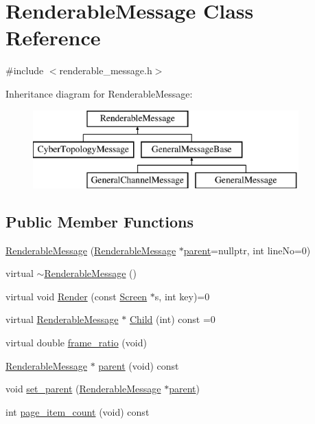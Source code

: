 \hypertarget{classRenderableMessage}{\section{Renderable\-Message Class Reference}
\label{classRenderableMessage}
}


{\ttfamily \#include $<$renderable\-\_\-message.\-h$>$}

Inheritance diagram for Renderable\-Message\-:\begin{figure}[H]
\begin{center}
\leavevmode
\includegraphics[height=3.000000cm]{classRenderableMessage}
\end{center}
\end{figure}
\subsection*{Public Member Functions}
\begin{DoxyCompactItemize}
\item 
\hyperlink{classRenderableMessage_afdf4e7a3ff674f72bc6c9bba9997a422}{Renderable\-Message} (\hyperlink{classRenderableMessage}{Renderable\-Message} $\ast$\hyperlink{classRenderableMessage_ab23728d14d9aff3efa0af7639ec6059c}{parent}=nullptr, int line\-No=0)
\item 
virtual \hyperlink{classRenderableMessage_a2a539566921f83ea97eed0ea8965d842}{$\sim$\-Renderable\-Message} ()
\item 
virtual void \hyperlink{classRenderableMessage_a3f65c247f5db9bb4918bca7d665bbdc6}{Render} (const \hyperlink{classScreen}{Screen} $\ast$s, int key)=0
\item 
virtual \hyperlink{classRenderableMessage}{Renderable\-Message} $\ast$ \hyperlink{classRenderableMessage_a0f933ad0befd4d3cf3a95e205c7398d6}{Child} (int) const =0
\item 
virtual double \hyperlink{classRenderableMessage_a7b8a1627a96d0b0658be68c1ad6b99a5}{frame\-\_\-ratio} (void)
\item 
\hyperlink{classRenderableMessage}{Renderable\-Message} $\ast$ \hyperlink{classRenderableMessage_ab23728d14d9aff3efa0af7639ec6059c}{parent} (void) const 
\item 
void \hyperlink{classRenderableMessage_a3313d82739bb1dc2da225a40aacfc9b6}{set\-\_\-parent} (\hyperlink{classRenderableMessage}{Renderable\-Message} $\ast$\hyperlink{classRenderableMessage_ab23728d14d9aff3efa0af7639ec6059c}{parent})
\item 
int \hyperlink{classRenderableMessage_a6ada5869afedf204cc031e3345624017}{page\-\_\-item\-\_\-count} (void) const 
\end{DoxyCompactItemize}
